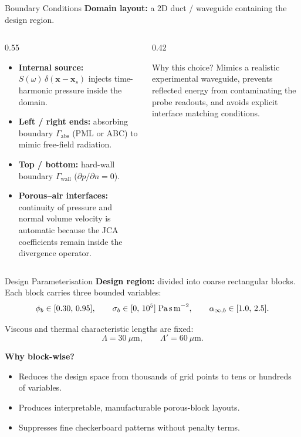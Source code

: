 \documentclass[aspectratio=169,11pt]{beamer}
\begin{document}
\begin{frame}{Boundary Conditions}
  \textbf{Domain layout:} a 2D duct / waveguide containing the design region.

  \vspace{0.1cm}
  \begin{columns}[T]
    \begin{column}{0.55\textwidth}
      \footnotesize
      \setlength{\itemsep}{2pt}
      \begin{itemize}
        \item \textbf{Internal source:} $S(\omega)\,\delta(\mathbf{x}-\mathbf{x}_s)$ injects time-harmonic pressure inside the domain.
        \item \textbf{Left / right ends:} absorbing boundary $\Gamma_\text{abs}$ (PML or ABC) to mimic free-field radiation.
        \item \textbf{Top / bottom:} hard-wall boundary $\Gamma_\text{wall}$ ($\partial p/\partial n = 0$).
        \item \textbf{Porous--air interfaces:} continuity of pressure and normal volume velocity is automatic because the JCA coefficients remain inside the divergence operator.
      \end{itemize}
    \end{column}
    \begin{column}{0.42\textwidth}
      \begin{block}{\footnotesize Why this choice?}
        \scriptsize
        Mimics a realistic experimental waveguide, prevents reflected energy from contaminating the probe readouts, and avoids explicit interface matching conditions.
      \end{block}
    \end{column}
  \end{columns}
\end{frame}

\begin{frame}{Design Parameterisation}
  \textbf{Design region:} divided into coarse rectangular blocks. Each block carries three bounded variables:
  \[
    \phi_b \in [0.30,\,0.95], \qquad
    \sigma_b \in [0,\,10^5]\;\text{Pa\,s\,m}^{-2}, \qquad
    \alpha_{\infty,b} \in [1.0,\,2.5].
  \]

  \vspace{0.2cm}
  Viscous and thermal characteristic lengths are fixed:
  \[
    \Lambda = 30~\mu\text{m}, \qquad \Lambda' = 60~\mu\text{m}.
  \]

  \vspace{0.2cm}
  \textbf{Why block-wise?}
  \begin{itemize}
    \item Reduces the design space from thousands of grid points to tens or hundreds of variables.
    \item Produces interpretable, manufacturable porous-block layouts.
    \item Suppresses fine checkerboard patterns without penalty terms.
  \end{itemize}
\end{frame}
\end{document}

